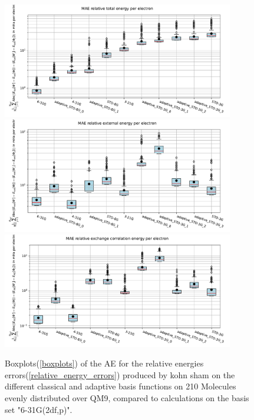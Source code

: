 \begin{figure}
    \centering
    \includegraphics[width=0.9\textwidth]{chapters/results/results_images/adaptive_basis_functions/relative_total_energy_adaptive_basis_sets}
    \includegraphics[width=0.9\textwidth]{chapters/results/results_images/adaptive_basis_functions/relative_coulomb_energy_adaptive_basis_sets}
    \includegraphics[width=0.9\textwidth]{chapters/results/results_images/adaptive_basis_functions/relative_exchange_correlation_energy_adaptive_basis_sets}
    \caption{Boxplots(\ref{boxplots}) of the AE for the relative energies errors(\ref{relative_energy_errors}) produced by kohn sham on the different classical and adaptive basis functions on 210 Molecules evenly distributed over QM9, compared to calculations on the basis set "6-31G(2df,p)".}
    \label{fig:AE_relative_energies_adaptive_basis_sets}
\end{figure}

